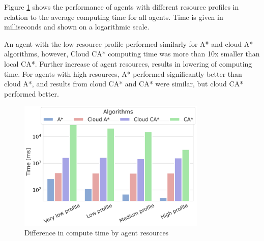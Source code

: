 Figure \ref{fig:compare_profiles_log} shows the performance of agents with different resource profiles in relation to the average computing time for all agents. Time is given in milliseconds and shown on a logarithmic scale.

An agent with the low resource profile performed similarly for A* and cloud A* algorithms, however, Cloud CA* computing time was more than 10x smaller than local CA*. Further increase of agent resources, results in lowering of computing time. For agents with high resources, A* performed significantly better than cloud A*, and results from cloud CA* and CA* were similar, but cloud CA* performed better.
\begin{figure}[H]
    \centering
    \includegraphics[width=0.8\textwidth]{pictures/compare_profiles_log.png}
    \caption{Difference in compute time by agent resources}
    \label{fig:compare_profiles_log}
\end{figure}